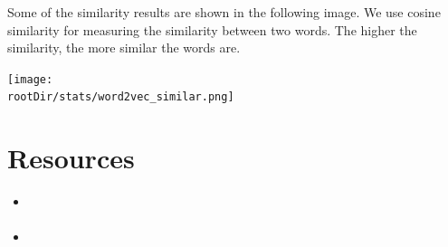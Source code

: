 \documentclass[12pt, letterpaper]{article}
\def\rootDir{../..}
\begin{document}
    Some of the similarity results are shown in the following image. We use cosine similarity for measuring the similarity between two words. The higher the similarity, the more similar the words are.
    \begin{center}
        \texttt{[image: \\rootDir/stats/word2vec\_similar.png]}
    \end{center}

    \section{Resources}\label{sec:resources}
    \begin{itemize}
        \item \url{}
        \item \url{}
    \end{itemize}
\end{document}
